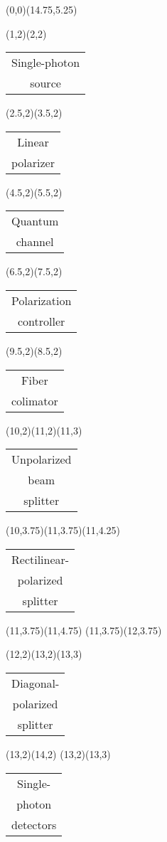 \documentclass[pstricks]{standalone}
\begin{document}
	\begin{pspicture}(0,0)(14.75,5.25)
		\begin{optexp}
		  	
			\optsource[compname=Source, labeloffset=1, sourcewidth=1, abspos=0.1](1,2)(2,2){{\begin{tabular}{@{}c@{}}Single-photon\\source\end{tabular}}}
			\optfiberpolarizer[compname=Pol1, labeloffset=1](2.5,2)(3.5,2){{\begin{tabular}{@{}c@{}}Linear\\polarizer\end{tabular}}}
			\optfiber[compname=Fiber, labeloffset=1](4.5,2)(5.5,2){{\begin{tabular}{@{}c@{}}Quantum\\channel\end{tabular}}}
			\polcontrol[compname=PolCtrl, labeloffset=1](6.5,2)(7.5,2){{\begin{tabular}{@{}c@{}}Polarization\\controller\end{tabular}}}
			\fibercollimator[compname=Colimator, labelangle=180, labeloffset=1](9.5,2)(8.5,2){{\begin{tabular}{@{}c@{}}Fiber\\colimator\end{tabular}}}
			\beamsplitter[compname=BeamSplitter1, labelangle=-90, labeloffset=1.2](10,2)(11,2)(11,3){{\begin{tabular}{@{}c@{}}Unpolarized\\beam\\splitter\end{tabular}}}

			\beamsplitter[compname=BeamSplitter2a, labelangle=180, labeloffset=1.4](10,3.75)(11,3.75)(11,4.25){{\begin{tabular}{@{}c@{}}Rectilinear-\\polarized\\splitter\end{tabular}}}
			\optdetector[compname=Det1a](11,3.75)(11,4.75)
			\optdetector[compname=Det1b](11,3.75)(12,3.75)

			\beamsplitter[compname=BeamSplitter2b, labelangle=-90, labeloffset=1.2](12,2)(13,2)(13,3){{\begin{tabular}{@{}c@{}}Diagonal-\\polarized\\splitter\end{tabular}}}
			\optdetector[compname=Det2a](13,2)(14,2)
			\optdetector[compname=Det2b, labeloffset=1.2, labelangle=80](13,2)(13,3){{\begin{tabular}{@{}c@{}}Single-\\photon\\detectors\end{tabular}}}
			

\end{optexp}
\end{pspicture}
\end{document}
